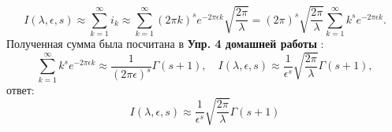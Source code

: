\begin{equation*}
I(\lambda,\epsilon,s) \approx \sum_{k=1}^{\infty} i_k \approx \sum_{k=1}^{\infty} (2 \pi k)^se^{-2 \pi \epsilon k}\sqrt{\frac{2 \pi}{\lambda}} = (2 \pi)^s\sqrt{\frac{2 \pi}{\lambda}} \sum_{k=1}^{\infty} k^se^{-2 \pi \epsilon k}.
\end{equation*}
Полученная сумма была посчитана в \textbf{Упр. 4 домашней работы }:
\begin{equation*}
  \sum_{k=1}^{\infty} k^se^{-2 \pi \epsilon k} \approx \frac{1}{(2 \pi \epsilon)^s}\Gamma(s + 1),\quad I(\lambda,\epsilon,s) \approx \frac{1}{\epsilon^s}\sqrt{\frac{2 \pi}{\lambda}}\Gamma(s+1),
\end{equation*}
ответ:
\begin{equation*}
\boxed{I(\lambda,\epsilon,s) \approx \frac{1}{\epsilon^s}\sqrt{\frac{2 \pi}{\lambda}}\Gamma(s+1)}
\end{equation*}